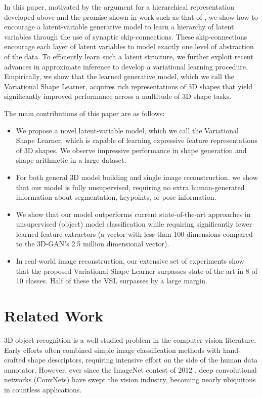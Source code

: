\documentclass[10pt,twocolumn,letterpaper]{article}
\begin{document}
In this paper, motivated by the argument for a hierarchical representation developed above and the promise shown in work such as that of \cite{edwards2016towards}, we show how to encourage a latent-variable generative model to learn a hierarchy of latent variables through the use of synaptic skip-connections. These skip-connections encourage each layer of latent variables to model exactly one level of abstraction of the data. To efficiently learn such a latent structure, we further exploit recent advances in approximate inference \cite{kingma2013auto} to develop a variational learning procedure. Empirically, we show that the learned generative model, which we call the Variational Shape Learner, acquires rich representations of 3D shapes that yield significantly improved performance across a multitude of 3D shape tasks.

The main contributions of this paper are as follows:
\begin{itemize}[leftmargin=*]
  \item We propose a novel latent-variable model, which we call the Variational Shape Learner, which is capable of learning expressive feature representations of 3D shapes. We observe impressive performance in shape generation and shape arithmetic in a large dataset.
  \item For both general 3D model building and single image reconstruction, we show that our model is fully unsupervised, requiring no extra human-generated information about segmentation, keypoints, or pose information.
  \item We show that our model outperforms current state-of-the-art approaches in unsupervised (object) model classification while requiring significantly fewer learned feature extractors (a vector with less than 100 dimensions compared to the 3D-GAN's 2.5 million dimensional vector).
  \item In real-world image reconstruction, our extensive set of experiments show that the proposed Variational Shape Learner surpasses state-of-the-art in 8 of 10 classes. Half of these the VSL surpasses by a large margin.
\end{itemize}

\section{Related Work} \label{sec:rw}
3D object recognition is a well-studied problem in the computer vision literature. Early efforts \cite{patterson2008object,knopp2010hough,rusu2009fast} often combined simple image classification methods with hand-crafted shape descriptors, requiring intensive effort on the side of the human data annotator. However, ever since the ImageNet contest of 2012 \cite{krizhevsky2012imagenet}, deep convolutional networks (ConvNets) \cite{fukushima1988neocognitron,lecun1989backpropagation} have swept the vision industry, becoming nearly ubiquitous in countless applications.
\end{document}
